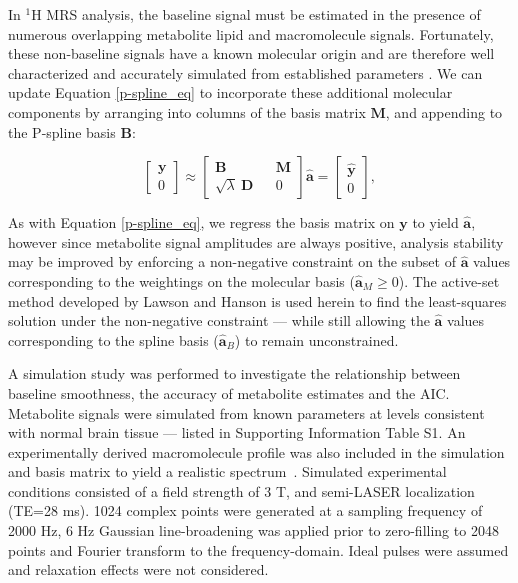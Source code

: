 \documentclass[num-refs]{wiley-article}
\begin{document}
In $^1\mathrm{H}$ MRS analysis, the baseline signal must be estimated in the presence of numerous overlapping metabolite lipid and macromolecule signals. Fortunately, these non-baseline signals have a known molecular origin and are therefore well characterized and accurately simulated from established parameters \cite{Govind2015}. We can update Equation \ref{p-spline_eq} to incorporate these additional molecular components by arranging into columns of the basis matrix $\mathbf{M}$, and appending to the P-spline basis $\mathbf{B}$:

\begin{equation}
  \begin{bmatrix}
    \textbf{y} \\ 0
  \end{bmatrix}
  \approx
  \begin{bmatrix}
    \textbf{B} && \textbf{M} \\ \sqrt{\lambda} \ \textbf{D} && 0
  \end{bmatrix} \hat{\mathbf{a}} =
  \begin{bmatrix}
    \hat{\textbf{y}} \\ 0
  \end{bmatrix},
  \label{mrs_bl}
\end{equation}

As with Equation \ref{p-spline_eq}, we regress the basis matrix on $\mathbf{y}$ to yield $\hat{\mathbf{a}}$, however since metabolite signal amplitudes are always positive, analysis stability may be improved by enforcing a non-negative constraint on the subset of $\hat{\mathbf{a}}$ values corresponding to the weightings on the molecular basis ($\hat{\mathbf{a}}_{M} \geq 0$). The active-set method developed by Lawson and Hanson \cite{Lawson1995} is used herein to find the least-squares solution under the non-negative constraint --- while still allowing the $\hat{\mathbf{a}}$ values corresponding to the spline basis ($\hat{\mathbf{a}}_{B}$) to remain unconstrained.

A simulation study was performed to investigate the relationship between baseline smoothness, the accuracy of metabolite estimates and the AIC. Metabolite signals were simulated from known parameters \cite{Govind2015} at levels consistent with normal brain tissue \cite{deGraaf2018} --- listed in Supporting Information Table S1. An experimentally derived macromolecule profile was also included in the simulation and basis matrix to yield a realistic spectrum~\cite{Birch2017}. Simulated experimental conditions consisted of a field strength of 3 T, and semi-LASER localization (TE=28 ms). 1024 complex points were generated at a sampling frequency of 2000 Hz, 6 Hz Gaussian line-broadening was applied prior to zero-filling to 2048 points and Fourier transform to the frequency-domain. Ideal pulses were assumed and relaxation effects were not considered.
\end{document}
